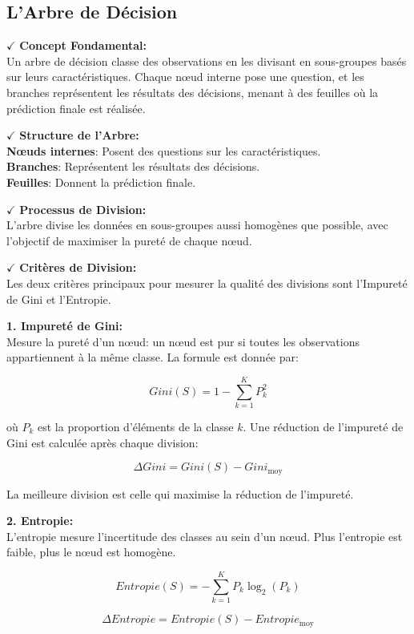 \subsection{L’Arbre de Décision}

\textbf{\(\checkmark\)} \textbf{Concept Fondamental:}\\
Un arbre de décision classe des observations en les divisant en sous-groupes basés sur leurs caractéristiques. Chaque nœud interne pose une question, et les branches représentent les résultats des décisions, menant à des feuilles où la prédiction finale est réalisée.

\textbf{\(\checkmark\)} \textbf{Structure de l'Arbre:}\\
\textbf{Nœuds internes}: Posent des questions sur les caractéristiques.\\
\textbf{Branches}: Représentent les résultats des décisions.\\
\textbf{Feuilles}: Donnent la prédiction finale.

\textbf{\(\checkmark\)} \textbf{Processus de Division:}\\
L'arbre divise les données en sous-groupes aussi homogènes que possible, avec l'objectif de maximiser la pureté de chaque nœud.

\textbf{\(\checkmark\)} \textbf{Critères de Division:}\\
Les deux critères principaux pour mesurer la qualité des divisions sont l'Impureté de Gini et l'Entropie.

\textbf{1. Impureté de Gini:}\\
Mesure la pureté d’un nœud: un nœud est pur si toutes les observations appartiennent à la même classe. La formule est donnée par:

\[
Gini(S) = 1 - \sum_{k=1}^{K} P_k^2
\]

où \( P_k \) est la proportion d'éléments de la classe \( k \). Une réduction de l'impureté de Gini est calculée après chaque division:

\[
\Delta Gini = Gini(S) - Gini_{\text{moy}}
\]

La meilleure division est celle qui maximise la réduction de l'impureté.

\textbf{2. Entropie:}\\
L'entropie mesure l'incertitude des classes au sein d’un nœud. Plus l'entropie est faible, plus le nœud est homogène.

\[
Entropie(S) = -\sum_{k=1}^{K} P_k \log_2(P_k)
\]

\[
\Delta Entropie = Entropie(S) - Entropie_{\text{moy}}
\]

